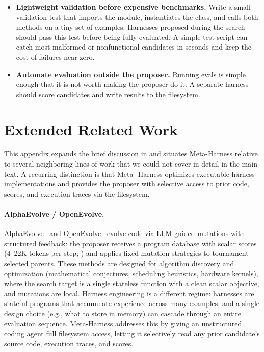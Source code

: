 \begin{itemize}[leftmargin=*]
\item \textbf{Lightweight validation before expensive benchmarks.}
Write a small validation test that imports the module, instantiates the class, and calls both methods on a tiny set of examples.
Harnesses proposed during the search should pass this test before being fully evaluated.
A simple test script can catch most malformed or nonfunctional candidates in seconds and keep the cost of failures near zero.

\item \textbf{Automate evaluation outside the proposer.}
Running evals is simple enough that it is not worth making the proposer do it.
A separate harness should score candidates and write results to the filesystem.

\end{itemize}

\section{Extended Related Work}
\label{app:extended-related-work}

This appendix expands the brief discussion in  and situates Meta-Harness relative to several neighboring lines of work that we could not cover in detail in the main text. A recurring distinction is that Meta-
Harness optimizes executable harness implementations and provides the proposer with selective access to prior code, scores, and execution traces via the filesystem.

\paragraph{AlphaEvolve / OpenEvolve.}
AlphaEvolve~\citep{novikov2025alphaevolve} and OpenEvolve~\citep{openevolve} evolve code via LLM-guided mutations with structured feedback: the proposer receives a program database with scalar scores (4--22K tokens per step; ) and applies fixed mutation strategies to tournament-selected parents.
These methods are designed for algorithm discovery and optimization (mathematical conjectures, scheduling heuristics, hardware kernels), where the search target is a single stateless function with a clean scalar objective, and mutations are local.
Harness engineering is a different regime: harnesses are stateful programs that accumulate experience across many examples, and a single design choice (e.g., what to store in memory) can cascade through an entire evaluation sequence.
Meta-Harness addresses this by giving an unstructured coding agent full filesystem access, letting it selectively read any prior candidate's source code, execution traces, and scores.

